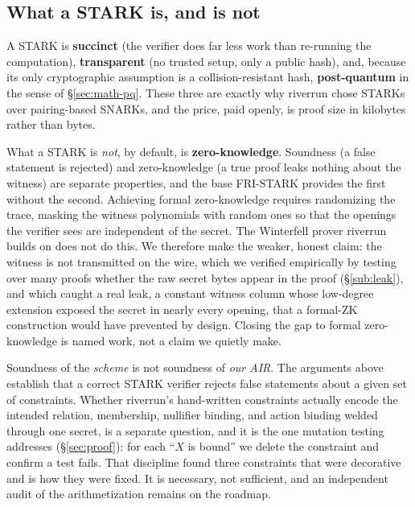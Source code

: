 \documentclass[11pt]{article}
\begin{document}
\subsection{What a STARK is, and is not}

A STARK is \textbf{succinct} (the verifier does far less work than re-running the
computation), \textbf{transparent} (no trusted setup, only a public hash), and, because
its only cryptographic assumption is a collision-resistant hash, \textbf{post-quantum} in
the sense of \S\ref{sec:math-pq}. These three are exactly why riverrun chose STARKs over
pairing-based SNARKs, and the price, paid openly, is proof size in kilobytes rather than
bytes.

What a STARK is \emph{not}, by default, is \textbf{zero-knowledge}. Soundness (a false
statement is rejected) and zero-knowledge (a true proof leaks nothing about the witness)
are separate properties, and the base FRI-STARK provides the first without the second.
Achieving formal zero-knowledge requires randomizing the trace, masking the witness
polynomials with random ones so that the openings the verifier sees are independent of the
secret. The Winterfell prover riverrun builds on does not do this. We therefore make the
weaker, honest claim: the witness is not transmitted on the wire, which we verified
empirically by testing over many proofs whether the raw secret bytes appear in the proof
(\S\ref{sub:leak}), and which caught a real leak, a constant witness column whose
low-degree extension exposed the secret in nearly every opening, that a formal-ZK
construction would have prevented by design. Closing the gap to formal zero-knowledge is
named work, not a claim we quietly make.

\begin{honest}
Soundness of the \emph{scheme} is not soundness of \emph{our AIR}. The arguments above
establish that a correct STARK verifier rejects false statements about a given set of
constraints. Whether riverrun's hand-written constraints actually encode the intended
relation, membership, nullifier binding, and action binding welded through one secret, is
a separate question, and it is the one mutation testing addresses (\S\ref{sec:proof}): for
each ``$X$ is bound'' we delete the constraint and confirm a test fails. That discipline
found three constraints that were decorative and is how they were fixed. It is necessary,
not sufficient, and an independent audit of the arithmetization remains on the roadmap.
\end{honest}
\end{document}
